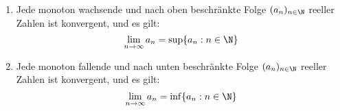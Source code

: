\begin{enumerate}[label=\alph*),leftmargin=*]
    \item Jede monoton wachsende und nach oben beschränkte Folge $(a_n)_{n \in \N}$ reeller Zahlen ist konvergent, und es gilt:
    $$\lim_{n \to \infty} a_n = \sup\{a_n : n \in \N\}$$
    \item Jede monoton fallende und nach unten beschränkte Folge $(a_n)_{n \in \N}$ reeller Zahlen ist konvergent, und es gilt:
    $$\lim_{n \to \infty} a_n = \inf\{a_n : n \in \N\}$$
\end{enumerate}